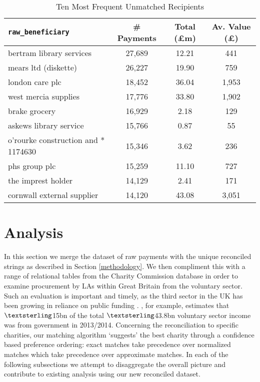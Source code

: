 \documentclass[12pt]{article}
\begin{document}
\begin{table}[!t]
\centering
\caption{Ten Most Frequent Unmatched Recipients}
\begin{small}
\label{mostfrequentlyunmatched}
\begin{tabular}{lccc}
\toprule
\texttt{raw\_beneficiary}                                                                                   & \# Payments & Total (£m) & Av. Value (£) \\  \midrule
bertram library services            & 27,689              & 12.21    & 441             \\
mears ltd (diskette)                & 26,227              & 19.90    & 759             \\
london care plc                     & 18,452              & 36.04    & 1,953            \\
west mercia supplies                & 17,776              & 33.80    & 1,902            \\
brake grocery                       & 16,929              & 2.18     & 129             \\
askews library service              & 15,766              & 0.87    & 55              \\
o'rourke construction and * 1174630 & 15,346              & 3.62     & 236             \\
phs group plc                       & 15,259              & 11.10    & 727             \\
the imprest holder                  & 14,129              & 2.41     & 171             \\
cornwall external supplier          & 14,120              & 43.08    & 3,051           \\ \bottomrule
\end{tabular}
\end{small}
\end{table}

\section{Analysis}\label{analysis}

In this section we merge the dataset of raw payments with the unique reconciled strings as described in Section \ref{methodology}. We then compliment this with a range of relational tables from the Charity Commission database in order to examine procurement by LAs within Great Britain from the voluntary sector. Such an evaluation is important and timely, as the third sector in the UK has been growing in reliance on public funding \citep{cliffordfreidamohan2010}. \cite{ncvo2016}, for example, estimates that $\textsterling$15bn of the total $\textsterling$43.8bn voluntary sector income was from government in 2013/2014. Concerning the reconciliation to specific charities, our matching algorithm `suggests' the best charity through a confidence based preference ordering: exact matches take precedence over normalized matches which take precedence over approximate matches. In each of the following subsections we attempt to disaggregate the overall picture and contribute to existing analysis using our new reconciled dataset.
\end{document}
